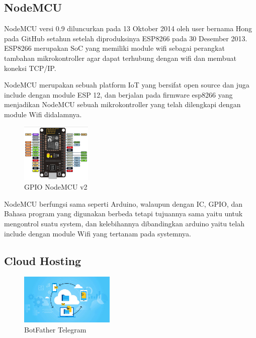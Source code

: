 \documentclass[conference]{IEEEtran}
\begin{document}
    \subsection{NodeMCU}
    NodeMCU versi 0.9 diluncurkan pada 13 Oktober 2014 oleh user bernama Hong pada GitHub setahun setelah diproduksinya ESP8266 pada 30 Desember 2013. ESP8266 merupakan SoC yang memiliki module wifi sebagai perangkat tambahan mikrokontroller agar dapat terhubung dengan wifi dan membuat koneksi TCP/IP.

    NodeMCU merupakan sebuah platform IoT yang bersifat open source dan juga include dengan module ESP 12, dan berjalan pada firmware esp8266 yang menjadikan NodeMCU sebuah mikrokontroller yang telah dilengkapi dengan module Wifi didalamnya.

    \begin{figure}[h]
        \centering
        \includegraphics[width=0.3\textwidth]{Nodem.png}
        \caption{GPIO NodeMCU v2}
    \end{figure}

    NodeMCU berfungsi sama seperti Arduino, walaupun dengan IC, GPIO, dan Bahasa program yang digunakan berbeda tetapi tujuannya sama yaitu untuk mengontrol suatu system, dan kelebihannya dibandingkan arduino yaitu telah include dengan module Wifi yang tertanam pada systemnya.

    \subsection{Cloud Hosting}
    \begin{figure}[h]
        \centering
        \includegraphics[width=0.4\textwidth]{cloudhosting.jpg}
        \caption{BotFather Telegram}
    \end{figure}
\end{document}

